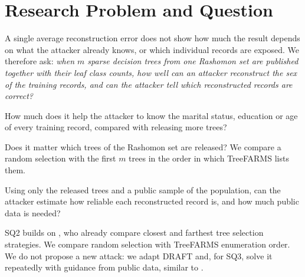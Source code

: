 \section{Research Problem and Question}

A single average reconstruction error does not show how much the result depends on what the
attacker already knows, or which individual records are exposed. We therefore ask: \emph{when $m$ sparse decision trees from one Rashomon set are published together
with their leaf class counts, how well can an attacker reconstruct the sex of the training
records, and can the attacker tell which reconstructed records are correct?} 
\begin{description}[leftmargin=1.2em,itemsep=0pt,topsep=2pt]
  \item[SQ1.] How much does it help the attacker to know the marital status, education or age
      of every training record, compared with releasing more trees?
  \item[SQ2.] Does it matter which trees of the Rashomon set are released? We compare a
      random selection with the first $m$ trees in the order in which TreeFARMS lists them.
  \item[SQ3.] Using only the released trees and a public sample of the population, can the
      attacker estimate how reliable each reconstructed record is, and how much public data is needed?
\end{description}
SQ2 builds on \citet{hsu2026rashomon}, who already compare closest and farthest tree
selection strategies. We compare random selection with TreeFARMS enumeration order.
We do not propose a new attack: we adapt DRAFT and, for SQ3, solve it repeatedly with
guidance from public data, similar to \citet{dick2023confidence}.
